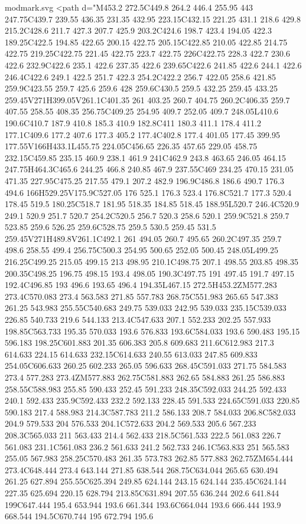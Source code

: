 \begin{filecontents}[noheader]{modmark.svg}
	<path d="M453.2 272.5C449.8 264.2 446.4 255.95 443 247.75C439.7 239.55 436.35 231.35 432.95 223.15C432.15 221.25 431.1 218.6 429.8 215.2C428.6 211.7 427.3 207.7 425.9 203.2C424.6 198.7 423.4 194.05 422.3 189.25C422.5 194.85 422.65 200.15 422.75 205.15C422.85 210.05 422.85 214.75 422.75 219.25C422.75 221.45 422.75 223.7 422.75 226C422.75 228.3 422.7 230.6 422.6 232.9C422.6 235.1 422.6 237.35 422.6 239.65C422.6 241.85 422.6 244.1 422.6 246.4C422.6 249.1 422.5 251.7 422.3 254.2C422.2 256.7 422.05 258.6 421.85 259.9C423.55 259.7 425.6 259.6 428 259.6C430.5 259.5 432.25 259.45 433.25 259.45V271H399.05V261.1C401.35 261 403.25 260.7 404.75 260.2C406.35 259.7 407.55 258.55 408.35 256.75C409.25 254.95 409.7 252.05 409.7 248.05L410.6 190.6C410.7 187.9 410.8 185.3 410.9 182.8C411 180.3 411.1 178.4 411.2 177.1C409.6 177.2 407.6 177.3 405.2 177.4C402.8 177.4 401.05 177.45 399.95 177.55V166H433.1L455.75 224.05C456.65 226.35 457.65 229.05 458.75 232.15C459.85 235.15 460.9 238.1 461.9 241C462.9 243.8 463.65 246.05 464.15 247.75H464.3C465.6 244.25 466.8 240.85 467.9 237.55C469 234.25 470.15 231.05 471.35 227.95C475.25 217.55 479.1 207.2 482.9 196.9C486.8 186.6 490.7 176.3 494.6 166H529.25V175.9C527.05 176 525.1 176.3 523.4 176.8C521.7 177.3 520.4 178.45 519.5 180.25C518.7 181.95 518.35 184.85 518.45 188.95L520.7 246.4C520.9 249.1 520.9 251.7 520.7 254.2C520.5 256.7 520.3 258.6 520.1 259.9C521.8 259.7 523.85 259.6 526.25 259.6C528.75 259.5 530.5 259.45 531.5 259.45V271H489.8V261.1C492.1 261 494.05 260.7 495.65 260.2C497.35 259.7 498.6 258.55 499.4 256.75C500.3 254.95 500.65 252.05 500.45 248.05L499.25 216.25C499.25 215.05 499.15 213 498.95 210.1C498.75 207.1 498.55 203.85 498.35 200.35C498.25 196.75 498.15 193.4 498.05 190.3C497.75 191 497.45 191.7 497.15 192.4C496.85 193 496.6 193.65 496.4 194.35L467.15 272.5H453.2ZM577.283 273.4C570.083 273.4 563.583 271.85 557.783 268.75C551.983 265.65 547.383 261.25 543.983 255.55C540.683 249.75 539.033 242.95 539.033 235.15C539.033 226.85 540.733 219.6 544.133 213.4C547.633 207.1 552.233 202.25 557.933 198.85C563.733 195.35 570.033 193.6 576.833 193.6C584.033 193.6 590.483 195.15 596.183 198.25C601.883 201.35 606.383 205.8 609.683 211.6C612.983 217.3 614.633 224.15 614.633 232.15C614.633 240.55 613.033 247.85 609.833 254.05C606.633 260.25 602.233 265.05 596.633 268.45C591.033 271.75 584.583 273.4 577.283 273.4ZM577.883 262.75C581.883 262.65 584.883 261.25 586.883 258.55C588.983 255.85 590.433 252.45 591.233 248.35C592.033 244.25 592.433 240.1 592.433 235.9C592.433 232.2 592.133 228.45 591.533 224.65C591.033 220.85 590.183 217.4 588.983 214.3C587.783 211.2 586.133 208.7 584.033 206.8C582.033 204.9 579.533 204 576.533 204.1C572.633 204.2 569.533 205.6 567.233 208.3C565.033 211 563.433 214.4 562.433 218.5C561.533 222.5 561.083 226.7 561.083 231.1C561.083 236.2 561.633 241.2 562.733 246.1C563.833 251 565.583 255.05 567.983 258.25C570.483 261.35 573.783 262.85 577.883 262.75ZM654.444 273.4C648.444 273.4 643.144 271.85 638.544 268.75C634.044 265.65 630.494 261.25 627.894 255.55C625.394 249.85 624.144 243.15 624.144 235.45C624.144 227.35 625.694 220.15 628.794 213.85C631.894 207.55 636.244 202.6 641.844 199C647.444 195.4 653.944 193.6 661.344 193.6C664.044 193.6 666.444 193.9 668.544 194.5C670.744 195 672.794 195.6 
\end{filecontents}
